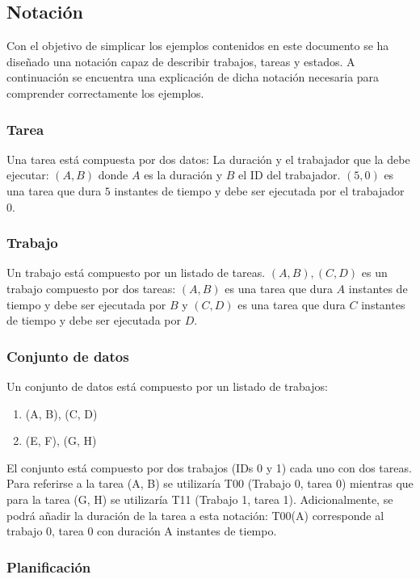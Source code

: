 \subsection{Notación}

Con el objetivo de simplicar los ejemplos contenidos en este documento
se ha diseñado una notación capaz de describir trabajos, tareas y estados.
A continuación se encuentra una explicación de dicha notación
necesaria para comprender correctamente los ejemplos.

\subsubsection{Tarea}

Una tarea está compuesta por dos datos: La duración y el trabajador que la debe ejecutar:
$(A, B)$ donde $A$ es la duración y $B$ el ID del trabajador.
$(5, 0)$ es una tarea que dura $5$ instantes de tiempo y debe ser ejecutada por el
trabajador $0$.

\subsubsection{Trabajo}

Un trabajo está compuesto por un listado de tareas.
$(A, B), (C, D)$ es un trabajo compuesto por dos tareas:
$(A, B)$ es una tarea que dura $A$ instantes de tiempo y debe ser ejecutada por $B$ y
$(C, D)$ es una tarea que dura $C$ instantes de tiempo y debe ser ejecutada por $D$.

\subsubsection{Conjunto de datos}

Un conjunto de datos está compuesto por un listado de trabajos:
\begin{enumerate}[start=0, itemsep=0.25px]
    \item (A, B), (C, D)
    \item (E, F), (G, H)
\end{enumerate}
El conjunto está compuesto por dos trabajos (IDs 0 y 1) cada uno con dos tareas.
Para referirse a la tarea (A, B) se utilizaría T00 (Trabajo 0, tarea 0)
mientras que para la tarea (G, H) se utilizaría T11 (Trabajo 1, tarea 1).
Adicionalmente, se podrá añadir la duración de la tarea a esta notación:
T00(A) corresponde al trabajo 0, tarea 0 con duración A instantes de tiempo.

\subsubsection{Planificación}

